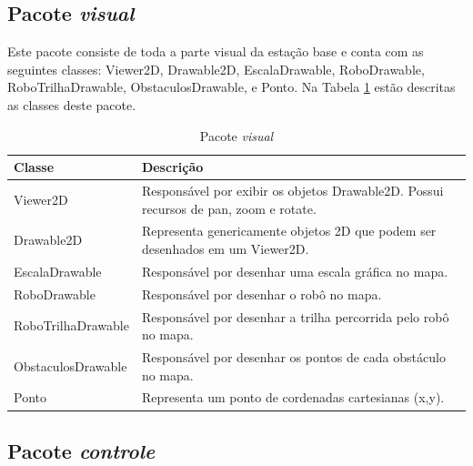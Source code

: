 \subsection{Pacote \textit{visual}}

Este pacote consiste de toda a parte visual da estação base e conta com as seguintes classes: Viewer2D, Drawable2D, EscalaDrawable, RoboDrawable, RoboTrilhaDrawable, ObstaculosDrawable, e Ponto. Na Tabela \ref{tab:pacote_visual} estão descritas as classes deste pacote.


\begin{table}[h]
  \centering
  \caption{Pacote \textit{visual}}
    \begin{tabular}{p{6cm}p{8cm}}
    \toprule
    \textbf{Classe} & \textbf{Descrição} \\
    \midrule
    Viewer2D & Responsável por exibir os objetos Drawable2D. Possui recursos de pan, zoom e rotate.   \\ \hline
    Drawable2D & Representa genericamente objetos 2D que podem ser desenhados em um Viewer2D. \\ \hline
    EscalaDrawable & Responsável por desenhar uma escala gráfica no mapa. \\ \hline
    RoboDrawable & Responsável por desenhar o robô no mapa. \\ \hline
    RoboTrilhaDrawable & Responsável por desenhar a trilha percorrida pelo robô no mapa. \\ \hline
    ObstaculosDrawable & Responsável por desenhar os pontos de cada obstáculo no mapa. \\ \hline
    Ponto & Representa um ponto de cordenadas cartesianas (x,y). \\ 
    \bottomrule
    \end{tabular}%
  \label{tab:pacote_visual}%
\end{table}%

\subsection{Pacote \textit{controle}}

